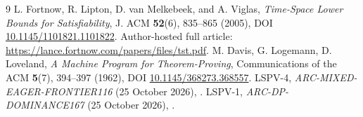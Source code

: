 \documentclass[11pt]{article}
\begin{document}
\begin{thebibliography}{9}\small
{} L. Fortnow, R. Lipton, D. van Melkebeek,
and A. Viglas, \emph{Time-Space Lower Bounds for Satisfiability},
J. ACM \textbf{52}(6), 835--865 (2005), DOI
\href{https://doi.org/10.1145/1101821.1101822}{10.1145/1101821.1101822}.
Author-hosted full article:
\url{https://lance.fortnow.com/papers/files/tst.pdf}.
 M. Davis, G. Logemann, D. Loveland,
\emph{A Machine Program for Theorem-Proving},
Communications of the ACM \textbf{5}(7), 394--397 (1962), DOI
\href{https://doi.org/10.1145/368273.368557}{10.1145/368273.368557}.
 LSPV-4, \emph{ARC-MIXED-EAGER-FRONTIER116}
(25 October 2026), .
 LSPV-1, \emph{ARC-DP-DOMINANCE167}
(25 October 2026), .
\end{thebibliography}
\end{document}
